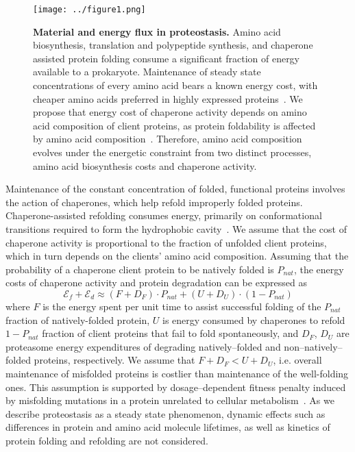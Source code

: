 \documentclass[10pt,letterpaper]{article}
\begin{document}
\begin{figure}[h!]
\texttt{[image: ../figure1.png]}
\caption{
{\bf Material and energy flux in proteostasis.}  Amino acid biosynthesis, translation and polypeptide synthesis, and chaperone assisted protein folding consume a significant fraction of energy available to a prokaryote. Maintenance of steady state concentrations of every amino acid bears a known energy cost, with cheaper amino acids preferred in highly expressed proteins~\cite{Akashi2002Metabolic}. We propose that energy cost of chaperone activity depends on amino acid composition of client proteins, as protein foldability is affected by amino acid composition~\cite{Dill1985Theory,Berezovsky2007Positive,Venev2015Massively}. Therefore, amino acid composition evolves under the energetic constraint from two distinct processes, amino acid biosynthesis costs and chaperone activity.
}
\label{fig:fig1}
\end{figure}


Maintenance of the constant concentration of folded, functional proteins involves the action of chaperones, which help refold improperly folded proteins. Chaperone-assisted refolding consumes energy, primarily on conformational transitions required to form the hydrophobic cavity~\cite{Hartl2011Molecular}. We assume that the cost of chaperone activity is proportional to the fraction of unfolded client proteins, which in turn depends on the clients' amino acid composition. Assuming that the probability of a chaperone client protein to be natively folded is $P_{nat}$, the energy costs of chaperone activity and protein degradation can be expressed as 
\begin{equation}
	\label{chaperone_degradation_cost}
	\mathcal{E}_{f} + \mathcal{E}_{d} \approx (F+D_{F})\cdot P_{nat} + (U+D_{U})\cdot\left(1-P_{nat}\right)
\end{equation}
where $F$ is the energy spent per unit time to assist successful folding of the $P_{nat}$ fraction of natively-folded protein, $U$ is energy consumed by chaperones to refold $1-P_{nat}$ fraction of client proteins that fail to fold spontaneously, and $D_F$, $D_U$ are proteasome energy expenditures of degrading natively--folded and non--natively--folded proteins, respectively. We assume that $F+D_{F}<U+D_{U}$, i.e. overall maintenance of misfolded proteins  is costlier than maintenance of the well-folding ones. This assumption is supported by dosage--dependent fitness penalty induced by misfolding mutations in a protein unrelated to cellular metabolism~\cite{Samerotte2011Misfolded}. As we describe proteostasis as a steady state phenomenon, dynamic effects such as differences in protein and amino acid molecule lifetimes, as well as kinetics of protein folding and refolding are not considered.
\end{document}
